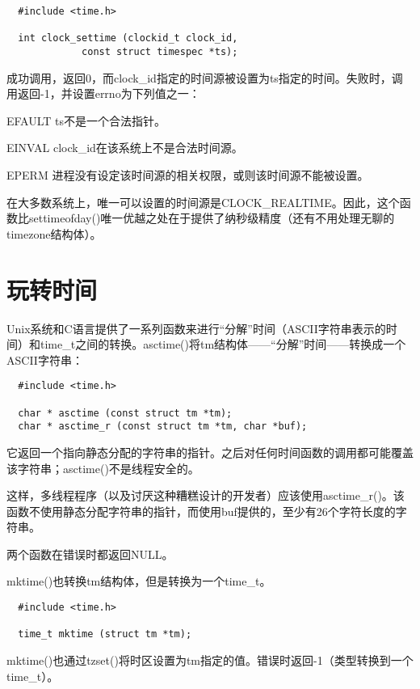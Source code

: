 \begin{lstlisting}
  #include <time.h>

  int clock_settime (clockid_t clock_id,
		     const struct timespec *ts);
\end{lstlisting}

成功调用，返回0，而clock\_id指定的时间源被设置为ts指定的时间。失败时，调用返回-1，并设置errno为下列值之一： 

\begin{eqlist*}
\item [EFAULT]
ts不是一个合法指针。  
\item [EINVAL]
clock\_id在该系统上不是合法时间源。  
\item [EPERM]
进程没有设定该时间源的相关权限，或则该时间源不能被设置。 
\end{eqlist*}

在大多数系统上，唯一可以设置的时间源是CLOCK\_REALTIME。因此，这个函数比settimeofday()唯一优越之处在于提供了纳秒级精度（还有不用处理无聊的timezone结构体）。 

\section{玩转时间}

Unix系统和C语言提供了一系列函数来进行“分解”时间（ASCII字符串表示的时间）和time\_t之间的转换。asctime()将tm结构体——“分解”时间——转换成一个ASCII字符串： 

\begin{lstlisting}
  #include <time.h>

  char * asctime (const struct tm *tm);
  char * asctime_r (const struct tm *tm, char *buf);
\end{lstlisting}

它返回一个指向静态分配的字符串的指针。之后对任何时间函数的调用都可能覆盖该字符串；asctime()不是线程安全的。

这样，多线程程序（以及讨厌这种糟糕设计的开发者）应该使用asctime\_r()。该函数不使用静态分配字符串的指针，而使用buf提供的，至少有26个字符长度的字符串。

两个函数在错误时都返回NULL。

mktime()也转换tm结构体，但是转换为一个time\_t。 

\begin{lstlisting}
  #include <time.h>

  time_t mktime (struct tm *tm);
\end{lstlisting}

mktime()也通过tzset()将时区设置为tm指定的值。错误时返回-1（类型转换到一个time\_t）。

